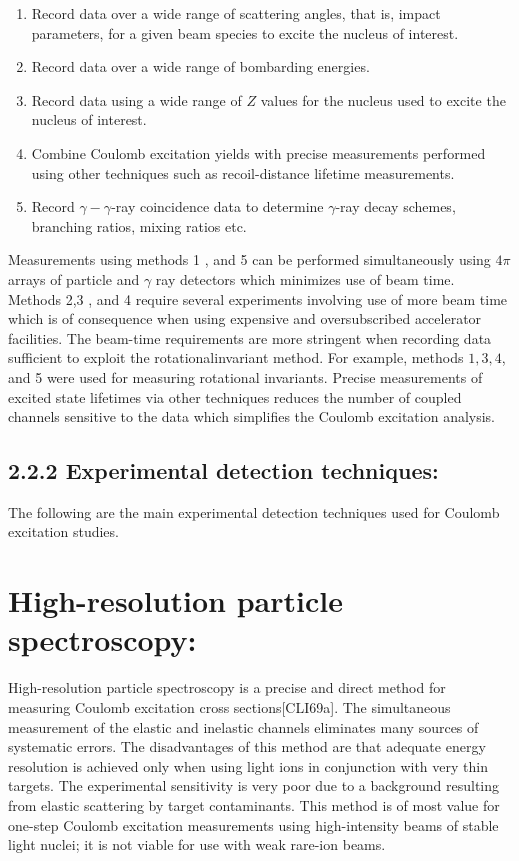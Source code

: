 \documentclass[10pt]{article}
\begin{document}
\begin{enumerate}
  \item Record data over a wide range of scattering angles, that is, impact parameters, for a given beam species to excite the nucleus of interest.
  \item Record data over a wide range of bombarding energies.
  \item Record data using a wide range of $Z$ values for the nucleus used to excite the nucleus of interest.
  \item Combine Coulomb excitation yields with precise measurements performed using other techniques such as recoil-distance lifetime measurements.
  \item Record $\gamma-\gamma$-ray coincidence data to determine $\gamma$-ray decay schemes, branching ratios, mixing ratios etc.
\end{enumerate}

Measurements using methods 1 , and 5 can be performed simultaneously using $4 \pi$ arrays of particle and $\gamma$ ray detectors which minimizes use of beam time. Methods 2,3 , and 4 require several experiments involving use of more beam time which is of consequence when using expensive and oversubscribed accelerator facilities. The beam-time requirements are more stringent when recording data sufficient to exploit the rotationalinvariant method. For example, methods $1,3,4$, and 5 were used for measuring rotational invariants. Precise measurements of excited state lifetimes via other techniques reduces the number of coupled channels sensitive to the data which simplifies the Coulomb excitation analysis.

\subsection*{2.2.2 Experimental detection techniques:}
The following are the main experimental detection techniques used for Coulomb excitation studies.

\section*{High-resolution particle spectroscopy:}
High-resolution particle spectroscopy is a precise and direct method for measuring Coulomb excitation cross sections[CLI69a]. The simultaneous measurement of the elastic and inelastic channels eliminates many sources of systematic errors. The disadvantages of this method are that adequate energy resolution is achieved only when using light ions in conjunction with very thin targets. The experimental sensitivity is very poor due to a background resulting from elastic scattering by target contaminants. This method is of most value for one-step Coulomb excitation measurements using high-intensity beams of stable light nuclei; it is not viable for use with weak rare-ion beams.
\end{document}

